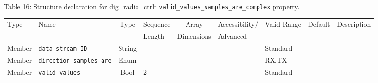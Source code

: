 \documentclass{article}
\def\comp{dig\_radio\_ctrlr}
\begin{document}
\begin{landscape}
	\noindent Table \hypertarget{tab16}{16}: Structure declaration for \comp{} \verb+valid_values_samples_are_complex+ property.
	\begin{scriptsize}
		\noindent\begin{longtable}{|p{1.8cm}|p{3.6cm}|c|p{2cm}|c|p{2cm}|p{1.7cm}|p{0.8cm}|p{6.81cm}|}
			\hline
			\rowcolor{blue}
			Type         & Name                                & Type & Sequence & Array      & Accessibility/ & Valid Range  & Default & Description                                                                                                                                                                                                                       \\
			\rowcolor{blue}
			             &                                     &      & Length   & Dimensions & Advanced       &              &         &                                                                                                                                                                                                                             \\
			\hline
			Member       & \verb+data_stream_ID+               & String& -       & -          & -              & Standard     & -       & - \\
			\hline
			Member       & \verb+direction_samples_are+        & Enum  & -       & -          & -              & RX,TX        & -       & - \\
			\hline
			Member       & \verb+valid_values+                 & Bool  & 2       & -          & -              & Standard & -       & - \\
			\hline
		\end{longtable}
	\end{scriptsize}


\end{landscape}
\end{document}
